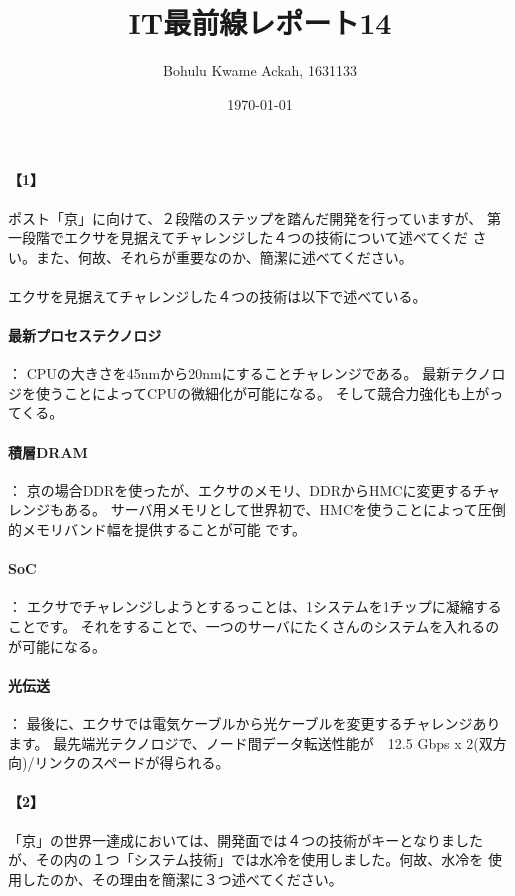 \documentclass[20 pts]{article}
\title{IT最前線レポート14}
\author{Bohulu Kwame Ackah, 1631133}
\date{\today}
\begin{document}
\maketitle

\newpage
\paragraph{【1】}ポスト「京」に向けて、２段階のステップを踏んだ開発を行っていますが、
第一段階でエクサを見据えてチャレンジした４つの技術について述べてくだ
さい。また、何故、それらが重要なのか、簡潔に述べてください。 \\
\paragraph{}
エクサを見据えてチャレンジした４つの技術は以下で述べている。
\paragraph{最新プロセステクノロジ}：
CPUの大きさを45nmから20nmにすることチャレンジである。
最新テクノロジを使うことによってCPUの微細化が可能になる。
そして競合力強化も上がってくる。
\paragraph{積層DRAM}：
京の場合DDRを使ったが、エクサのメモリ、DDRからHMCに変更するチャレンジもある。
サーバ用メモリとして世界初で、HMCを使うことによって圧倒的メモリバンド幅を提供することが可能
です。
\paragraph{SoC}：
エクサでチャレンジしようとするっことは、1システムを1チップに凝縮することです。
それをすることで、一つのサーバにたくさんのシステムを入れるのが可能になる。
\paragraph{光伝送}：
最後に、エクサでは電気ケーブルから光ケーブルを変更するチャレンジあります。
最先端光テクノロジで、ノード間データ転送性能が　12.5 Gbps x 2(双方向)/リンクのスペードが得られる。

\paragraph{【2】}「京」の世界一達成においては、開発面では４つの技術がキーとなりました
が、その内の１つ「システム技術」では水冷を使用しました。何故、水冷を
使用したのか、その理由を簡潔に３つ述べてください。\\
\end{document}
